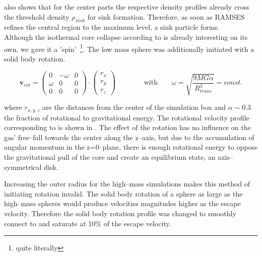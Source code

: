  also shows that for the center parts the respective density profiles already cross the threshold density $\rho_{sink}$ for sink formation.
Therefore, as soon as RAMSES refines the central region to the maximum level, a sink particle forms.
\\[6pt]
%
Although the isothermal core collapse according to  is already interesting on its own, we gave it a 'spin'~\footnote{quite literally}.
The low mass sphere was additionally initiated with a solid body rotation.

\begin{equation}
  \textbf{v}_{rot}=\begin{pmatrix}
                    0       & -\omega  & 0\\
                    \omega  & 0        & 0\\
                    0       & 0        & 0
                   \end{pmatrix}\cdot\begin{pmatrix}
                   r_{x}\\
                   r_{y}\\
                   r_{z}
                   \end{pmatrix}
                   \qquad\qquad \text{with}\qquad \omega=\sqrt{\frac{9MG\alpha}{R_{trunc}^{3}}}=const.
\label{eq:rot_vel}
\end{equation}

where $r_{x,y,z}$ are the distances from the center of the simulation box and $\alpha\sim0.3$ the fraction of rotational to gravitational energy.
The rotational velocity profile corresponding to  is shown in .
The effect of the rotation has no influence on the gas' free--fall towards the center along the z--axis, but due to the accumulation of angular momentum in the z=0--plane, there is enough rotational energy to oppose the gravitational pull of the core and create an equilibrium state, an axis--symmetrical disk.

Increasing the outer radius for the high--mass simulations makes this method of initiating rotation invalid.
The solid body rotation of a sphere as large as the high--mass spheres would produce velocities magnitudes higher as the escape velocity.
Therefore the solid body rotation profile was changed to smoothly connect to and saturate at 10\% of the escape velocity.

